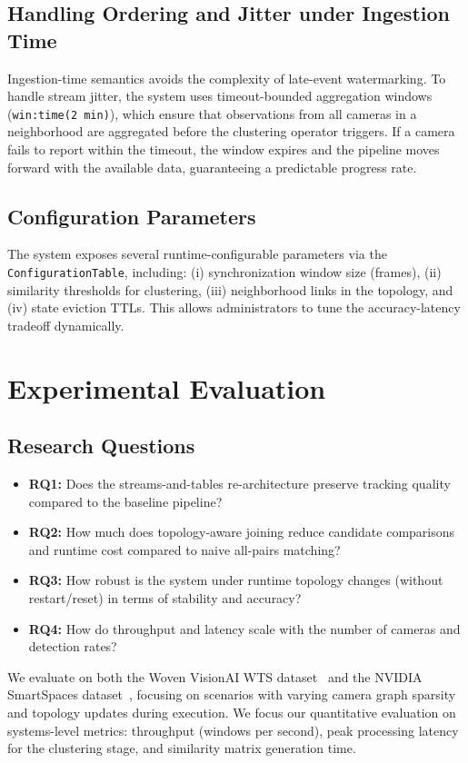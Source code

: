 \documentclass[11pt]{article}
\begin{document}
\subsection{Handling Ordering and Jitter under Ingestion Time}
Ingestion-time semantics avoids the complexity of late-event watermarking. To handle stream jitter, the system uses timeout-bounded aggregation windows (\texttt{win:time(2 min)}), which ensure that observations from all cameras in a neighborhood are aggregated before the clustering operator triggers. If a camera fails to report within the timeout, the window expires and the pipeline moves forward with the available data, guaranteeing a predictable progress rate.

\subsection{Configuration Parameters}
The system exposes several runtime-configurable parameters via the \texttt{ConfigurationTable}, including: (i) synchronization window size (frames), (ii) similarity thresholds for clustering, (iii) neighborhood links in the topology, and (iv) state eviction TTLs. This allows administrators to tune the accuracy-latency tradeoff dynamically.

\section{Experimental Evaluation}\label{sec:evaluation}

\subsection{Research Questions}

\begin{itemize}[leftmargin=*]
    \item \textbf{RQ1:} Does the streams-and-tables re-architecture preserve tracking quality compared to the baseline pipeline?
    \item \textbf{RQ2:} How much does topology-aware joining reduce candidate comparisons and runtime cost compared to naive all-pairs matching?
    \item \textbf{RQ3:} How robust is the system under runtime topology changes (without restart/reset) in terms of stability and accuracy?
    \item \textbf{RQ4:} How do throughput and latency scale with the number of cameras and detection rates?
\end{itemize}
We evaluate on both the Woven VisionAI WTS dataset~\cite{kong2024wts} and the NVIDIA SmartSpaces dataset~\cite{aicity2025track1}, focusing on scenarios with varying camera graph sparsity and topology updates during execution. We focus our quantitative evaluation on systems-level metrics: throughput (windows per second), peak processing latency for the clustering stage, and similarity matrix generation time.
\end{document}
